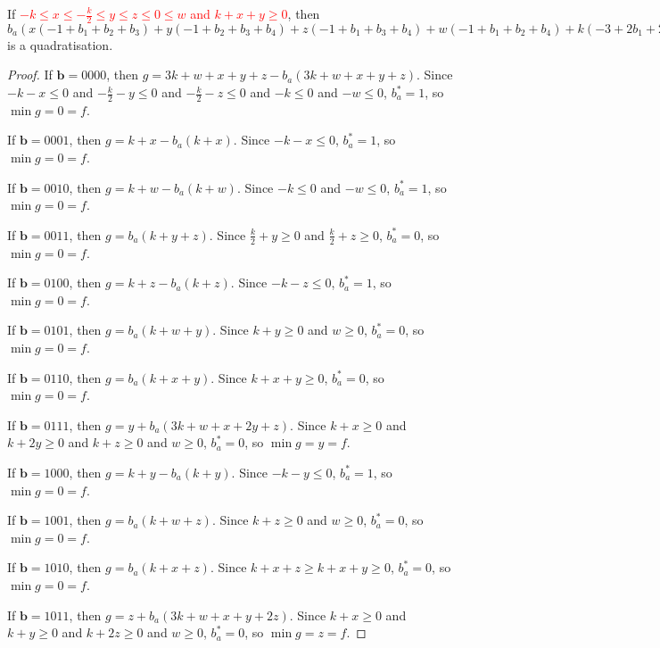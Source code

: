 \documentclass[11pt]{scrartcl}
\newcommand{\vc}[1]{\boldsymbol{#1}}
\begin{document}
\begin{lemma}
 If \textcolor{red}{$-k\le x \le -\frac{k}{2} \le y \le z \le 0 \le w$ and $k + x+ y \ge 0$}, then $b_a(x(-1+b_1+b_2+b_3)+y(-1+b_2+b_3+b_4)+z(-1+b_1+b_3+b_4)+w(-1+b_1+b_2+b_4)+k(-3+2b_1+2b_2+2b_3+2b_4))+x(+1 -b_1-b_2-b_3+b_1b_2+b_1b_3+b_2b_3)+y(+1 -b_2-b_3-b_4+b_2b_3+b_2b_4+b_3b_4)+z(+1 -b_1-b_3-b_4+b_1b_3+b_1b_4+b_3b_4)+w(+1 -b_1-b_2-b_4+b_1b_2+b_1b_4+b_2b_4)+k(+3 -2 b_1-2 b_2-2 b_3-2 b_4+b_1b_2+b_1b_3+b_1b_4+b_2b_3+b_2b_4+b_3b_4)$ is a quadratisation.\\
 \end{lemma}

\begin{proof}
If $\vc b = 0000$, then $g = 3k + w + x + y + z - b_a(3k + w + x + y + z)$.
Since $-k - x \le 0$ and $-\frac{k}{2} - y \le 0$ and $-\frac{k}{2} - z \le 0$ and $-k \le 0$ and $-w \le 0$,
$b_a^* = 1$, so $\min g = 0 = f$.

If $\vc b = 0001$, then $g = k + x - b_a(k + x)$.
Since $-k - x \le 0$, $b_a^* = 1$, so $\min g = 0 = f$.

If $\vc b = 0010$, then $g = k + w - b_a(k + w)$.
Since $-k \le 0$ and $-w \le 0$, $b_a^* = 1$, so $\min g = 0 = f$.

If $\vc b = 0011$, then $g = b_a(k + y + z)$.
Since  $\frac{k}{2} + y \ge 0$ and $\frac{k}{2} + z \ge 0$, $b_a^* = 0$, so $\min g = 0 = f$. 

If $\vc b = 0100$, then $g = k + z - b_a(k + z)$.
Since $-k - z \le 0$, $b_a^* = 1$, so $\min g = 0 = f$.

If $\vc b = 0101$, then $g = b_a(k + w + y)$.
Since $k + y \ge 0$ and $w \ge 0$, $b_a^* = 0$, so $\min g = 0 = f$.

If $\vc b = 0110$, then $g = b_a(k + x + y)$.
Since $k + x + y \ge 0$, $b_a^* = 0$, so $\min g = 0 = f$.

If $\vc b = 0111$, then $g = y + b_a(3k + w + x + 2y + z)$.
Since $k + x \ge 0 $ and $k + 2y \ge 0 $ and $k + z \ge 0$ and $w \ge 0 $, $b_a^* = 0$, so $\min g = y = f$.

If $\vc b = 1000$, then $g = k + y - b_a(k + y)$.
Since $-k - y \le 0$, $b_a^* = 1$, so $\min g = 0 = f$.

If $\vc b = 1001$, then $g = b_a(k + w + z)$.
Since $k + z \ge 0$ and $w \ge 0$, $b_a^* = 0$, so $\min g = 0 = f$.

If $\vc b = 1010$, then $g = b_a(k + x + z)$.
Since $k + x + z \ge k + x + y \ge 0$, $b_a^* = 0$, so $\min g = 0 = f$.

If $\vc b = 1011$, then $g = z + b_a(3k + w + x + y + 2z)$.
Since $k + x \ge 0 $ and $k + y \ge 0$ and $k + 2z \ge 0$ and $w \ge 0$, $b_a^* = 0$, so $\min g = z = f$.


\end{proof}
\end{document}

